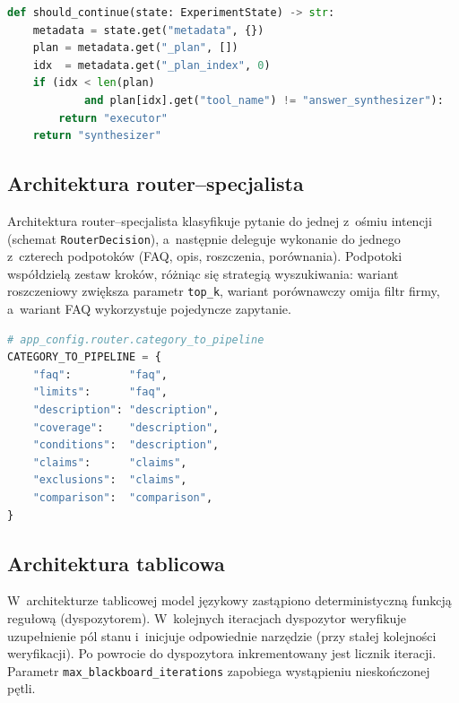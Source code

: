 \begin{lstlisting}[language=Python,
  caption={Warunek pętli wykonawcy},
  label={lst:warunek-petli-wykonawcy}]
def should_continue(state: ExperimentState) -> str:
    metadata = state.get("metadata", {})
    plan = metadata.get("_plan", [])
    idx  = metadata.get("_plan_index", 0)
    if (idx < len(plan)
            and plan[idx].get("tool_name") != "answer_synthesizer"):
        return "executor"
    return "synthesizer"
\end{lstlisting}

\subsection{Architektura router--specjalista}\label{subsec:architektura-router-specjalista}

Architektura router--specjalista klasyfikuje pytanie do jednej z~ośmiu intencji
(schemat \texttt{RouterDecision}), a~następnie deleguje wykonanie do jednego
z~czterech podpotoków (FAQ, opis, roszczenia, porównania). Podpotoki
współdzielą zestaw kroków, różniąc się strategią wyszukiwania: wariant
roszczeniowy zwiększa parametr \texttt{top\_k}, wariant porównawczy omija filtr
firmy, a~wariant FAQ wykorzystuje pojedyncze zapytanie.

\begin{lstlisting}[language=Python,
  caption={Mapowanie intencji na podpotoki},
  label={lst:mapowanie-intencji-na-podpotoki}]
# app_config.router.category_to_pipeline
CATEGORY_TO_PIPELINE = {
    "faq":         "faq",
    "limits":      "faq",
    "description": "description",
    "coverage":    "description",
    "conditions":  "description",
    "claims":      "claims",
    "exclusions":  "claims",
    "comparison":  "comparison",
}
\end{lstlisting}

\subsection{Architektura tablicowa}\label{subsec:architektura-tablicowa}

W~architekturze tablicowej model językowy zastąpiono deterministyczną funkcją
regułową (dyspozytorem). W~kolejnych iteracjach dyspozytor weryfikuje
uzupełnienie pól stanu i~inicjuje odpowiednie narzędzie (przy stałej kolejności
weryfikacji). Po powrocie do dyspozytora inkrementowany jest licznik iteracji.
Parametr \texttt{max\_blackboard\_iterations} zapobiega wystąpieniu
nieskończonej pętli.

